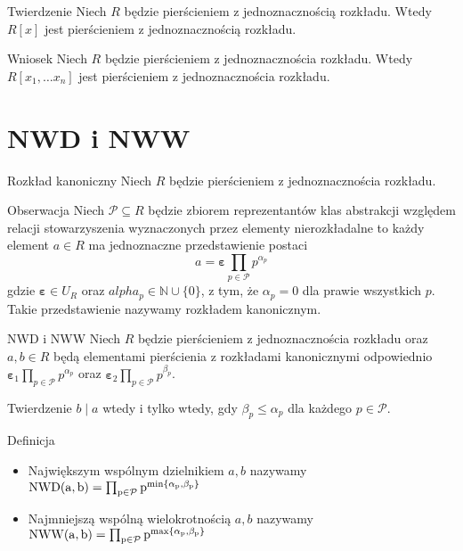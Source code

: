 \documentclass{beamer}
\newcommand{\NWD}{\rm{NWD}}
\newcommand{\NWW}{\rm{NWW}}
\renewcommand{\epsilon}{\bm{\varepsilon}}
\begin{document}
\begin{frame}
    \begin{block}{Twierdzenie}
        Niech $R$ będzie pierścieniem z jednoznacznością rozkładu. Wtedy $R[x]$ jest pierścieniem z jednoznacznością rozkładu.
    \end{block}
    \pause 
    \begin{alertblock}{Wniosek}
        Niech $R$ będzie pierścieniem z jednoznacznościa rozkładu. Wtedy $R[x_1, \ldots x_n]$ jest pierścieniem z jednoznacznościa rozkładu. 
    \end{alertblock}
\end{frame}

\section{NWD i NWW}
\begin{frame}{Rozkład kanoniczny}
    Niech $R$ będzie pierścieniem z jednoznacznościa rozkładu.
    \begin{alertblock}{Obserwacja}
        Niech $\mathcal{P} \subseteq R$ będzie zbiorem reprezentantów klas abstrakcji względem relacji stowarzyszenia
        wyznaczonych przez elementy nierozkładalne to każdy element $a \in R$ ma jednoznaczne przedstawienie postaci 
        $$a = \epsilon \prod_{p \in \mathcal{P}} p^{\alpha_{p}}$$
        gdzie $\epsilon \in U_R$ oraz $alpha_p \in \mathbb{N} \cup \{0\}$, z tym, że $\alpha_p = 0$ dla prawie wszystkich $p$. Takie przedstawienie nazywamy \alert{rozkładem kanonicznym}.
    \end{alertblock}
\end{frame}

\begin{frame}{NWD i NWW}
    Niech $R$ będzie pierścieniem z jednoznacznościa rozkładu oraz $a,b \in R$ będą elementami pierścienia z rozkładami kanonicznymi odpowiednio
    $\epsilon_1 \prod_{p \in \mathcal{P}} p^{\alpha_{p}}$ oraz $\epsilon_2 \prod_{p \in \mathcal{P}} p^{\beta_{p}}$. 
    \begin{alertblock}{Twierdzenie}
        $b \mid a$ wtedy i tylko wtedy, gdy $\beta_p \leq \alpha_p$ dla każdego $p \in \mathcal{P}$.
    \end{alertblock}
    \pause
    \begin{block}{Definicja}
        \begin{itemize}
            \item\alert{Największym wspólnym dzielnikiem} $a,b$ nazywamy $\NWD (a,b) = \prod_{p \in \mathcal{P}} p^{min\{\alpha_{p}, \beta_{p}\}}$
            \item \alert{Najmniejszą wspólną wielokrotnością} $a,b$ nazywamy $\NWW (a,b) = \prod_{p \in \mathcal{P}} p^{max\{\alpha_{p}, \beta_{p}\}} $
        \end{itemize}
    \end{block}
\end{frame}
\end{document}
